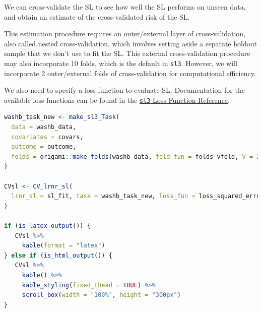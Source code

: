 \documentclass[
  12pt, krantz2,
]{book}
\newcommand{\passthrough}[1]{#1}
\theoremstyle{definition}
\theoremstyle{definition}
\theoremstyle{definition}
\newcommand{\1}{\mathbbm{1}}
\begin{document}
We can cross-validate the SL to see how well the SL performs on unseen data, and
obtain an estimate of the cross-validated risk of the SL.

This estimation procedure requires an outer/external layer of
cross-validation, also called nested cross-validation, which involves setting
aside a separate holdout sample that we don't use to fit the SL. This external
cross-validation procedure may also incorporate 10 folds, which is the default
in \passthrough{\lstinline!sl3!}. However, we will incorporate 2 outer/external folds of
cross-validation for computational efficiency.

We also need to specify a loss function to evaluate SL. Documentation for the
available loss functions can be found in the \href{https://tlverse.org/sl3/reference/loss_functions.html}{\passthrough{\lstinline!sl3!} Loss Function
Reference}.

\begin{lstlisting}[language=R]
washb_task_new <- make_sl3_Task(
  data = washb_data,
  covariates = covars,
  outcome = outcome,
  folds = origami::make_folds(washb_data, fold_fun = folds_vfold, V = 2)
)

CVsl <- CV_lrnr_sl(
  lrnr_sl = sl_fit, task = washb_task_new, loss_fun = loss_squared_error
)

if (is_latex_output()) {
   CVsl %>%
     kable(format = "latex")
} else if (is_html_output()) {
   CVsl %>%
     kable() %>%
     kable_styling(fixed_thead = TRUE) %>%
     scroll_box(width = "100%", height = "300px")
}
\end{lstlisting}
\end{document}
